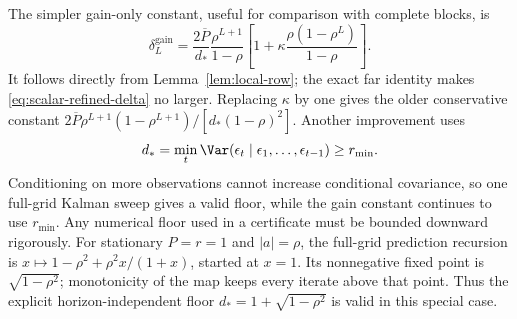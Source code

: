 The simpler gain-only constant, useful for comparison with complete blocks,
is
\begin{equation}
 \delta_L^{\mathrm{gain}}=
 \frac{2\overline P}{d_*}\frac{\rho^{L+1}}{1-\rho}
 \left[1+\kappa\frac{\rho(1-\rho^L)}{1-\rho}\right].
 \label{eq:gain-delta}
\end{equation}
It follows directly from Lemma~\ref{lem:local-row}; the exact far identity
makes \eqref{eq:scalar-refined-delta} no larger. Replacing $\kappa$ by one
gives the older conservative constant
$2\overline P\rho^{L+1}(1-\rho^{L+1})/[d_*(1-\rho)^2]$.
Another improvement uses
\begin{equation}
 d_* =\min_t\Var(\epsilon_t\mid\epsilon_1,\ldots,\epsilon_{t-1})
 \ge r_{\min}.
 \label{eq:full-grid-floor}
\end{equation}
Conditioning on more observations cannot increase conditional covariance,
so one full-grid Kalman sweep gives a valid floor, while the gain constant
continues to use $r_{\min}$. Any numerical floor used in a certificate must
be bounded downward rigorously.
For stationary $P=r=1$ and $|a|=\rho$, the full-grid prediction recursion
is $x\mapsto1-\rho^2+\rho^2x/(1+x)$, started at $x=1$.
Its nonnegative fixed point is $\sqrt{1-\rho^2}$; monotonicity of the map
keeps every iterate above that point. Thus the explicit horizon-independent
floor $d_*=1+\sqrt{1-\rho^2}$ is valid in this special case.

